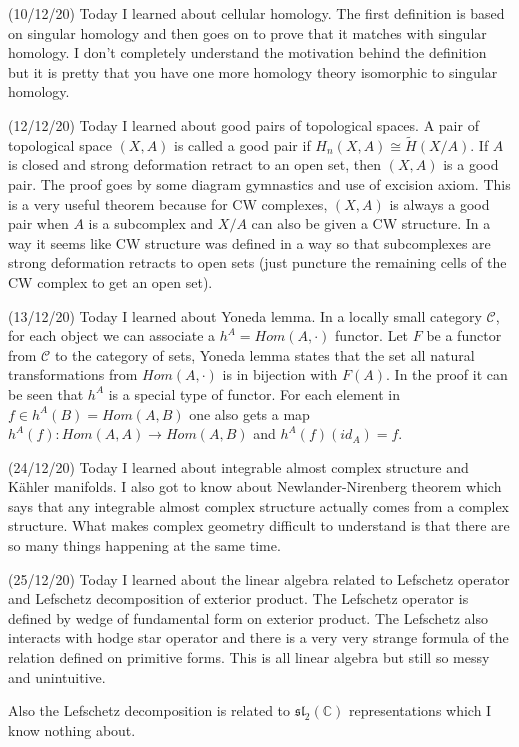 \documentclass[12pt,a4paper]{article}
\begin{document}
(10/12/20) Today I learned about cellular homology. The first definition is based on singular homology and then goes on to prove that it matches with singular homology. I don't completely understand the motivation behind the definition but it is pretty that you have one more homology theory isomorphic to singular homology.

(12/12/20) Today I learned about good pairs of topological spaces. A pair of topological space $(X,A)$ is called a good pair if $H_n(X,A) \cong \tilde{H}(X/A)$. If $A$ is closed and strong deformation retract to an open set, then $(X,A)$ is a good pair. The proof goes by some diagram gymnastics and use of excision axiom. This is a very useful theorem because for CW complexes, $(X,A)$ is always a good pair when $A$ is a subcomplex and $X/A$ can also be given a CW structure. In a way it seems like CW structure was defined in a way so that subcomplexes are strong deformation retracts to open sets (just puncture the remaining cells of the CW complex to get an open set).

(13/12/20) Today I learned about Yoneda lemma. In a locally small category $\mathcal{C}$, for each object we can associate a $h^A = Hom (A, \cdot)$ functor. Let $F$ be a functor from $\mathcal{C}$ to the category of sets, Yoneda lemma states that the set all natural transformations from $Hom(A, \cdot )$ is in bijection with $F(A)$. In the proof it can be seen that $h^A$ is a special type of functor. For each element in $f \in h^A(B) = Hom(A,B)$ one also gets a map $h^A(f) : Hom(A,A) \to Hom (A,B)$ and $h^A(f)(id_A) = f$.
    
(24/12/20) Today I learned about integrable almost complex structure and K\"{a}hler manifolds. I also got to know about Newlander-Nirenberg theorem which says that any integrable almost complex structure actually comes from a complex structure. What makes complex geometry difficult to understand is that there are so many things happening at the same time.

(25/12/20) Today I learned about the linear algebra related to Lefschetz operator and Lefschetz decomposition of exterior product. The Lefschetz operator is defined by wedge of fundamental form on exterior product. The Lefschetz also interacts with hodge star operator and there is a very very strange formula of the relation defined on primitive forms. This is all linear algebra but still so messy and unintuitive.

Also the Lefschetz decomposition is related to $\mathfrak{sl}_2(\mathbb{C})$ representations which I know nothing about.
\end{document}
